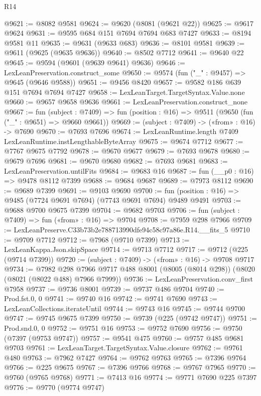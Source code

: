 \begin{lexlean}{R14}
\begin{coremodule}
@9621 := @8082 @9581
@9624 := @9620 (@8081 (@9621 @22))
@9625 := @9617 @9624
@9631 := @9595 @684 @151 @7694 @7694 @683 @7427
@9633 := @8194 @9581 @11
@9635 := @9631 (@9633 @683)
@9636 := @8101 @9581
@9639 := @9611 (@9625 (@9635 @9636))
@9640 := @8502 @7712
@9641 := @9640 @22
@9645 := @9594 (@9601 (@9639 @9641) @9636)
@9646 := LexLeanPreservation.construct_some
@9650 := @9574 (fun ("_" : @9457) => @9645 (@9646 @9588))
@9651 := @9456 @8420
@9657 := @9582 @186 @639 @151 @7694 @7694 @7427
@9658 := LexLeanTarget.TargetSyntax.Value.none
@9660 := @9657 @9658 @9636
@9661 := LexLeanPreservation.construct_none
@9667 := fun (subject : @7409) =>
  fun (position : @16) => @9511 (@9650 (fun ("_" : @9651) => @9660 @9661))
@9669 := (subject : @7409) -> («from» : @16) -> @7690
@9670 := @7693 @7696
@9674 := LexLeanRuntime.length @7409 LexLeanRuntime.instLengthableByteArray
@9675 := @9674 @7712
@9677 := @7767 @9675 @7792
@9678 := @9670 @9677
@9679 := @7693 @9678
@9680 := @9679 @7696
@9681 := @9670 @9680
@9682 := @7693 @9681
@9683 := LexLeanPreservation.untilFits
@9684 := @9683 @16
@9687 := fun (__p0 : @16) => @9478 @8112 @7399
@9688 := @9684 @9687
@9689 := @7973 @8112
@9690 := @9689 @7399
@9691 := @9103 @9690
@9700 := fun (position : @16) => @9485 (@7724 @9691 @7694) (@7743 @9691 @7694) @9489 @9491
@9703 := @9688 @9700 @9675 @7399
@9704 := @9682 @9703
@9706 := fun (subject : @7409) => fun («from» : @16) => @9704
@9708 := @7959 @298 @7966
@9709 := LexLeanPreserve.C33b73b2e788713990dfe94c58c97a86e.R14.__fits_5
@9710 := @9709 @7712
@9712 := @7968 (@9710 @7399)
@9713 := LexLeanKappa.Json.skipSpace
@9714 := @9713 @7712
@9717 := @9712 (@225 (@9714 @7399))
@9720 := (subject : @7409) -> («from» : @16) -> @9708 @9717
@9734 := @7982
    @298
    @7966
    @9717
    @488
    @8001
    (@8005 (@8014 @298))
    (@8020 (@8021 (@8022 @488) @7966 @7999))
@9736 := LexLeanPreservation.conv_first @7958
@9737 := @9736 @8001
@9739 := @9737 @486 @9704
@9740 := Prod.fst.{0, 0}
@9741 := @9740 @16
@9742 := @9741 @7690
@9743 := LexLeanCollections.iterateUntil
@9744 := @9743 @16
@9745 := @9744 @9700
@9747 := @9745 @9675 @7399
@9750 := @9739 (@225 (@9742 @9747))
@9751 := Prod.snd.{0, 0}
@9752 := @9751 @16
@9753 := @9752 @7690
@9756 := @9750 (@7397 (@9753 @9747))
@9757 := @9541 @475
@9760 := @9757 @485 @9681 @9703
@9761 := LexLeanTarget.TargetSyntax.Value.closure
@9762 := @9761 @480
@9763 := @7962 @7427
@9764 := @9762 @9763
@9765 := @7396 @9764
@9766 := @225 @9675
@9767 := @7396 @9766
@9768 := @9767 @7965
@9770 := @9760 (@9765 @9768)
@9771 := @7413 @16
@9774 := @9771 @7690 @225 @7397
@9776 := @9770 (@9774 @9747)

\end{coremodule}
\end{lexlean}
